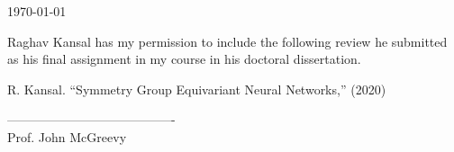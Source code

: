 \documentclass{article}
\begin{document}
\today

Raghav Kansal has my permission to include the following review he submitted as his final assignment in my course in his doctoral dissertation.

R. Kansal. ``Symmetry Group Equivariant Neural Networks,'' (2020)

\baselineskip
----------------------------------------\\
Prof. John McGreevy
\end{document}
